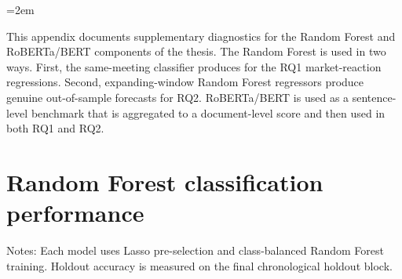 
\emergencystretch=2em

This appendix documents supplementary diagnostics for the Random Forest and
RoBERTa\slash BERT components of the thesis. The Random Forest is used in two ways.
First, the same-meeting classifier produces \rfscore{} for the RQ1
market-reaction regressions. Second, expanding-window Random Forest regressors
produce genuine out-of-sample forecasts for RQ2. RoBERTa\slash BERT is used as a
sentence-level benchmark that is aggregated to a document-level score and then
used in both RQ1 and RQ2.

\section{Random Forest classification performance}
\label{app:a3_rf_performance}

\begin{table}[H]
\centering
\caption{Random Forest classification performance}
\label{tab:a3_rf_performance}
\begin{threeparttable}
\small
{}
\begin{tablenotes}
\footnotesize
\item Notes: Each model uses Lasso pre-selection and class-balanced Random Forest training. Holdout accuracy is measured on the final chronological holdout block.
\end{tablenotes}
\end{threeparttable}
\end{table}


